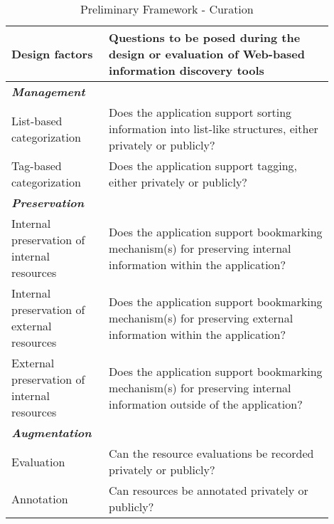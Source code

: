 \begin{table*}[htbp]
\caption{Preliminary Framework - Curation}
\centering
\label{table:old_framework_curation}
\footnotesize
\begin{tabular}{|p{0.25\linewidth}|p{0.65\linewidth}|}
\hline
\textbf{\small{Design factors}}   & \textbf{\small{Questions to be posed during the design or evaluation of Web-based information discovery tools 
}}  \\

\hline          
\emph{\textbf{Management}}                    &                                                                                                           \\
List-based categorization               & Does the application support sorting information into list-like structures, either privately or publicly?                                                  \\
Tag-based categorization               & Does the application support tagging, either privately or publicly?                                                  \\

\emph{\textbf{Preservation}}                   &                                                                                                           \\
Internal preservation of internal resources       & Does the application support bookmarking mechanism(s) for preserving internal information within the application?        \\
Internal preservation of external resources       & Does the application support bookmarking mechanism(s) for preserving external information within the application?        \\
External preservation of internal resources      & Does the application support bookmarking mechanism(s) for preserving internal information outside of the application? \\ 

\emph{\textbf{Augmentation}}            &                                                                                                           \\
Evaluation                   & Can the resource evaluations be recorded privately or publicly? \\
Annotation                   & Can resources be annotated privately or publicly?                                                                               \\    
       

\end{tabular}
\end{table*}
